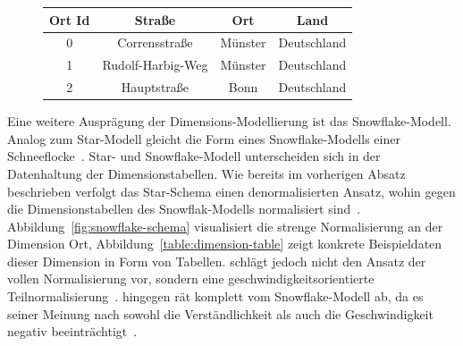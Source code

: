 \documentclass[
  language=german, %
  type=bachelor%
]{isthesis}
\begin{document}
\begin{content}
  \begin{figure}[caption={Beispiel der Dimensionstabelle \textit{Ort} im Star-Schema}, label={table:dimension-table}]
    \footnotesize
    \begin{tabular}{c c c c}
      Ort Id & Straße & Ort & Land \\
      \toprule
      0 & Corrensstraße & Münster & Deutschland \\
      1 & Rudolf-Harbig-Weg & Münster & Deutschland \\
      2 & Hauptstraße & Bonn & Deutschland \\
    \end{tabular}
  \end{figure}

  Eine weitere Ausprägung der Dimensions-Modellierung ist das Snowflake-Modell.
  Analog zum Star-Modell gleicht die Form eines Snowflake-Modells einer
  Schneeflocke~\cite[][S. 70]{Kemper2010}. Star- und Snowflake-Modell
  unterscheiden sich in der Datenhaltung der Dimensionstabellen. Wie bereits im
  vorherigen Absatz beschrieben verfolgt das Star-Schema einen denormalisierten
  Ansatz, wohin gegen die Dimensionstabellen des Snowflak-Modells normalisiert
  sind~\cite[][S. 70]{Kemper2010}. Abbildung~\ref{fig:snowflake-schema}
  visualisiert die strenge Normalisierung an der Dimension Ort,
  Abbildung~\ref{table:dimension-table} zeigt konkrete Beispieldaten dieser
  Dimension in Form von Tabellen.  \textsc{\citeauthor{Kemper2010}} schlägt
  jedoch nicht den Ansatz der vollen Normalisierung vor, sondern eine
  geschwindigkeitsorientierte Teilnormalisierung~\cite[][S. 70]{Kemper2010}.
  \textsc{\citeauthor{Kimball2013}} hingegen rät komplett vom Snowflake-Modell
  ab, da es seiner Meinung nach sowohl die Verständlichkeit als auch \ggf{} die
  Geschwindigkeit negativ beeinträchtigt~\cite[][S. 50]{Kimball2013}.

  \begin{figure}[caption={Teilausschnitt eines Snowflake-Schema}, label={fig:snowflake-schema}]
    \resizebox{250pt}{!}{}
  \end{figure}


\end{content}
\end{document}
